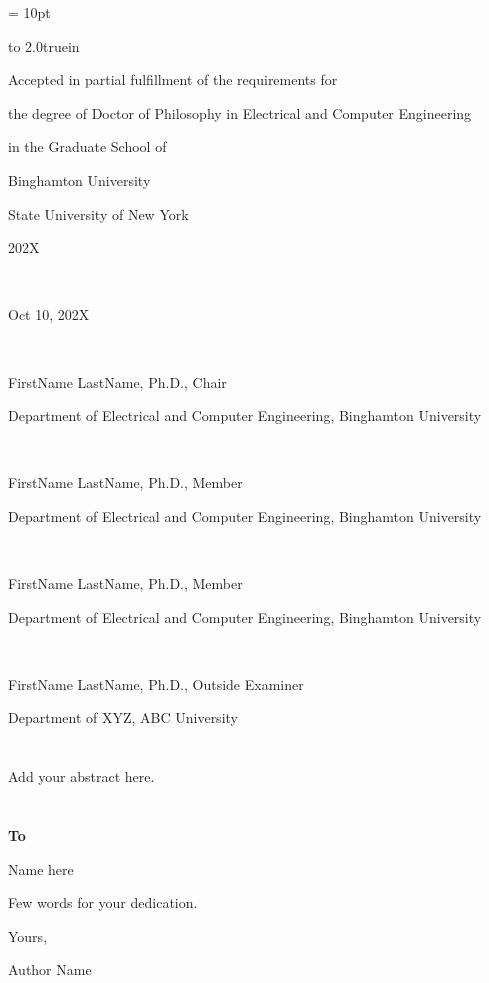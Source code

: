 \documentclass[12pt,oneside]{book}
\numberwithin{equation}{section}
\theoremstyle{plain}
\theoremstyle{definition}
\theoremstyle{remark}
\begin{document}
{\baselineskip = 10pt

\vbox to 2.0truein{}


\vskip 270pt

\centerline{Accepted in partial fulfillment of the requirements for}
\centerline{the degree of  Doctor of Philosophy in Electrical and Computer Engineering}
\centerline{in the Graduate School of}
\centerline{Binghamton University}
\centerline{State University of New York}
\centerline{202X}

\

\centerline{Oct 10, 202X}

\

\centerline{FirstName LastName, Ph.D., Chair}
\centerline{Department of Electrical and Computer Engineering, Binghamton University}


\

\centerline{FirstName LastName, Ph.D.,  Member}
\centerline{Department of Electrical and Computer Engineering, Binghamton University}

\

\centerline{FirstName LastName, Ph.D., Member}
\centerline{Department of Electrical and Computer Engineering, Binghamton University}

\

\centerline{FirstName LastName, Ph.D., Outside Examiner}
\centerline{Department of XYZ, ABC University}
}



\chapter*{}
\begin{doublespace}

Add your abstract here.
	

\end{doublespace}

\newpage

\chapter*{}
\bigskip
\begin{doublespace}
\centerline{\textbf{To}}
\centerline{Name here}

Few words for your dedication.

\bigbreak
\bigbreak
\centerline{Yours,}
\centerline{Author Name}
\end{doublespace}
\end{document}
